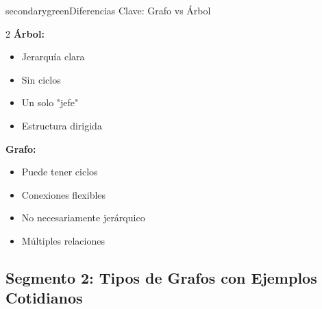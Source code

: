 \documentclass[12pt,a4paper]{article}
\begin{document}
	\begin{center}
	\end{center}
	
	\begin{presentationbox}{secondarygreen}{Diferencias Clave: Grafo vs Árbol}
		\begin{multicols}{2}
			\textbf{\textcolor{secondarygreen}{Árbol:}}
			\begin{itemize}
				\item[\textcolor{secondarygreen}{\faCheck}] Jerarquía clara
				\item[\textcolor{secondarygreen}{\faCheck}] Sin ciclos
				\item[\textcolor{secondarygreen}{\faCheck}] Un solo "jefe"
				\item[\textcolor{secondarygreen}{\faCheck}] Estructura dirigida
			\end{itemize}
			
			\columnbreak
			
			\textbf{\textcolor{primaryblue}{Grafo:}}
			\begin{itemize}
				\item[\textcolor{primaryblue}{\faCheck}] Puede tener ciclos
				\item[\textcolor{primaryblue}{\faCheck}] Conexiones flexibles
				\item[\textcolor{primaryblue}{\faCheck}] No necesariamente jerárquico
				\item[\textcolor{primaryblue}{\faCheck}] Múltiples relaciones
			\end{itemize}
		\end{multicols}
	\end{presentationbox}
	
	\newpage
	
	\subsection*{Segmento 2: Tipos de Grafos con Ejemplos Cotidianos}
	
\end{document}
